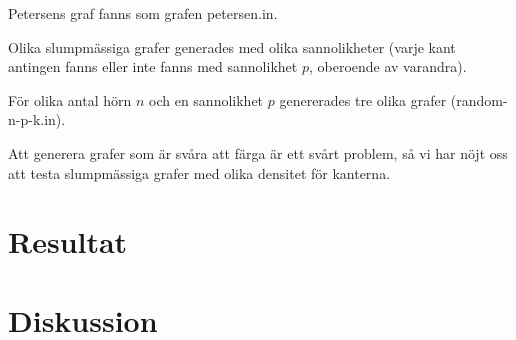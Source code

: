 \documentclass[a4paper]{report}
\begin{document}
Petersens graf fanns som grafen petersen.in.

Olika slumpmässiga grafer generades med olika sannolikheter (varje kant antingen fanns eller inte fanns med sannolikhet $p$, oberoende av varandra).

För olika antal hörn $n$ och en sannolikhet $p$ genererades tre olika grafer (random-n-p-k.in).

Att generera grafer som är svåra att färga är ett svårt problem, så vi har nöjt oss att testa slumpmässiga grafer med olika densitet för kanterna.

\chapter{Resultat}
\chapter{Diskussion}

\nocite{VanLint:2006}

{}
\end{document}
